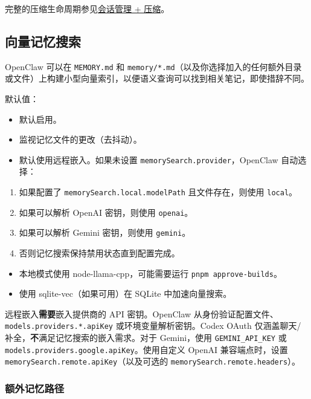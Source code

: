 完整的压缩生命周期参见\href{/reference/session-management-compaction}{会话管理 + 压缩}。

\subsection{向量记忆搜索}


OpenClaw 可以在 \texttt{MEMORY.md} 和 \texttt{memory/*.md}（以及你选择加入的任何额外目录或文件）上构建小型向量索引，以便语义查询可以找到相关笔记，即使措辞不同。

默认值：

\begin{itemize}
  \item 默认启用。
  \item 监视记忆文件的更改（去抖动）。
  \item 默认使用远程嵌入。如果未设置 \texttt{memorySearch.provider}，OpenClaw 自动选择：
\end{itemize}

\begin{enumerate}
  \item 如果配置了 \texttt{memorySearch.local.modelPath} 且文件存在，则使用 \texttt{local}。
  \item 如果可以解析 OpenAI 密钥，则使用 \texttt{openai}。
  \item 如果可以解析 Gemini 密钥，则使用 \texttt{gemini}。
  \item 否则记忆搜索保持禁用状态直到配置完成。
\end{enumerate}

\begin{itemize}
  \item 本地模式使用 node-llama-cpp，可能需要运行 \texttt{pnpm approve-builds}。
  \item 使用 sqlite-vec（如果可用）在 SQLite 中加速向量搜索。
\end{itemize}


远程嵌入\textbf{需要}嵌入提供商的 API 密钥。OpenClaw 从身份验证配置文件、\texttt{models.providers.*.apiKey} 或环境变量解析密钥。Codex OAuth 仅涵盖聊天/补全，\textbf{不}满足记忆搜索的嵌入需求。对于 Gemini，使用 \texttt{GEMINI\_API\_KEY} 或 \texttt{models.providers.google.apiKey}。使用自定义 OpenAI 兼容端点时，设置 \texttt{memorySearch.remote.apiKey}（以及可选的 \texttt{memorySearch.remote.headers}）。

\subsubsection{额外记忆路径}


